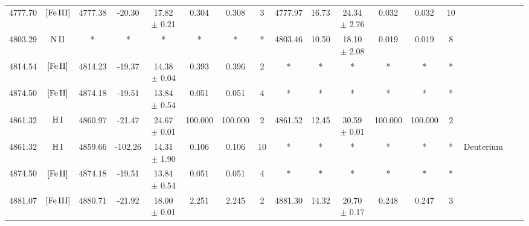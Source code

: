 \documentclass[twocolumn,linenumbers]{aastex63}
\begin{document}
\begin{table}
{\begin{tabular}{@{}ccccccccccccccccc@{}}
4777.70 & $\mbox{[Fe}\thinspace \mbox{III]}$ & 4777.38 & -20.30 & 17.82 $\pm$ 0.21 & 0.304 & 0.308 & 3 & 4777.97 & 16.73 & 24.34 $\pm$ 2.76 & 0.032 & 0.032 & 10 &   \\
4803.29 & $\mbox{N}\thinspace \mbox{II}$ & * & * & * & * & * & * & 4803.46 & 10.50 & 18.10 $\pm$ 2.08 & 0.019 & 0.019 & 8 &  \\
4814.54 & $\mbox{[Fe}\thinspace \mbox{II]}$ & 4814.23 & -19.37 & 14.38 $\pm$ 0.04 & 0.393 & 0.396 & 2 & * & * & * & * & * & * &  \\
4874.50 & $\mbox{[Fe}\thinspace \mbox{II]}$ & 4874.18 & -19.51 & 13.84 $\pm$ 0.54 & 0.051 & 0.051 & 4 & * & * & * & * & * & * &  \\
4861.32 & $\mbox{H}\thinspace \mbox{I}$ & 4860.97 & -21.47 & 24.67 $\pm$ 0.01 & 100.000 & 100.000 & 2 & 4861.52 & 12.45 & 30.59 $\pm$ 0.01 & 100.000 & 100.000 & 2 &  \\
4861.32 & $\mbox{H}\thinspace \mbox{I}$ & 4859.66 & -102.26 & 14.31 $\pm$ 1.90 & 0.106 & 0.106 & 10 & * & * & * & * & * & * &  Deuterium \\
4874.50 & $\mbox{[Fe}\thinspace \mbox{II]}$ & 4874.18 & -19.51 & 13.84 $\pm$ 0.54 & 0.051 & 0.051 & 4 & * & * & * & * & * & * &  \\
4881.07 & $\mbox{[Fe}\thinspace \mbox{III]}$ & 4880.71 & -21.92 & 18.00 $\pm$ 0.01 & 2.251 & 2.245 & 2 & 4881.30 & 14.32 & 20.70 $\pm$ 0.17 & 0.248 & 0.247 & 3 &   \\
\hline
\end{tabular}%
    }
\end{table}
\end{document}
